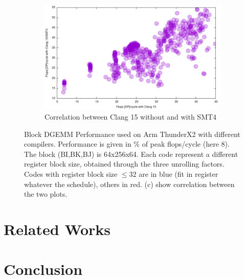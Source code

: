 \documentclass[sigconf,review]{acmart}
\begin{document}
\begin{figure}[ht]
\begin{subfigure}[h]{0.45\textwidth}
\includegraphics[width=\textwidth]{../benches/gemm/arm-64x256x64/clangxsmt.pdf}
  \caption{Correlation between Clang 15 without and with SMT4}
  \end{subfigure}
  \caption{Block DGEMM Performance used on Arm ThunderX2 with different compilers. Performance is given in \% of peak flops/cycle (here 8). The block (BI,BK,BJ) is 64x256x64. Each code represent a different register block size, obtained through the three unrolling factors. Codes with register block size $\leq 32$ are in blue (fit in register whatever the schedule), others in red. (c) show correlation between the two plots. \label{fig:cascadelake}}
\end{figure}

\section{Related Works}
\section{Conclusion}
\label{sec:conclusion}


\end{document}
